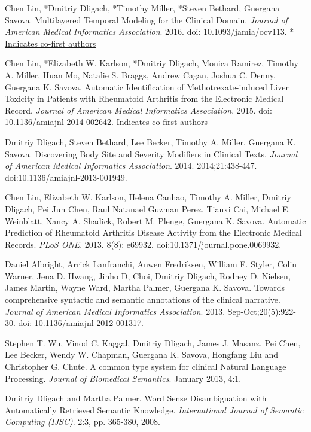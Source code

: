 \documentclass[letterpaper]{article}
\renewenvironment{itemize}{
  \begin{list}{}{
    \setlength{\leftmargin}{1.5em}
  }
}{
  \end{list}
}
\begin{document}
\begin{itemize}
\item *Chen Lin, *Dmitriy Dligach, *Timothy Miller, *Steven Bethard, Guergana Savova. Multilayered Temporal Modeling for the Clinical Domain. \emph{Journal of American Medical Informatics Association}. 2016. doi: 10.1093/jamia/ocv113. * \underline{Indicates co-first authors}
\item *Chen Lin, *Elizabeth W. Karlson, *Dmitriy Dligach, Monica Ramirez, Timothy A. Miller, Huan Mo, Natalie S. Braggs, Andrew Cagan, Joshua C. Denny, Guergana K. Savova. Automatic Identification of Methotrexate-induced Liver Toxicity in Patients with Rheumatoid Arthritis from the Electronic Medical Record. \emph{Journal of American Medical Informatics Association}. 2015. doi: 10.1136/amiajnl-2014-002642. \newline * \underline{Indicates co-first authors}
\item Dmitriy Dligach, Steven Bethard, Lee Becker, Timothy A. Miller, Guergana K. Savova. Discovering Body Site and Severity Modifiers in Clinical Texts. \emph{Journal of American Medical Informatics Association}. 2014. 2014;21:438-447. doi:10.1136/amiajnl-2013-001949.
\item Chen Lin, Elizabeth W. Karlson, Helena Canhao, Timothy A. Miller, Dmitriy Dligach, Pei Jun Chen, Raul Natanael Guzman Perez, Tianxi Cai, Michael E. Weinblatt, Nancy A. Shadick, Robert M. Plenge, Guergana K. Savova. Automatic Prediction of Rheumatoid Arthritis Disease Activity from the Electronic Medical Records. \emph{PLoS ONE}. 2013. 8(8): e69932. doi:10.1371/journal.pone.0069932.
\item Daniel Albright, Arrick Lanfranchi, Anwen Fredriksen, William F. Styler, Colin Warner, Jena D. Hwang, Jinho D, Choi, Dmitriy Dligach, Rodney D. Nielsen, James Martin, Wayne Ward, Martha Palmer, Guergana K. Savova. Towards comprehensive syntactic and semantic annotations of the clinical narrative. \emph{Journal of American Medical Informatics Association}. 2013. Sep-Oct;20(5):922-30. doi: 10.1136/amiajnl-2012-001317.
\item Stephen T. Wu, Vinod C. Kaggal, Dmitriy Dligach, James J. Masanz, Pei Chen, Lee Becker, Wendy W. Chapman, Guergana K. Savova, Hongfang Liu and Christopher G. Chute. A common type system for clinical Natural Language Processing. \emph{Journal of Biomedical Semantics}. January 2013, 4:1.
\item Dmitriy Dligach and Martha Palmer. Word Sense Disambiguation with Automatically Retrieved Semantic Knowledge. \emph {International Journal of Semantic Computing (IJSC)}. 2:3, pp. 365-380, 2008. 
\end{itemize}
\end{document}
